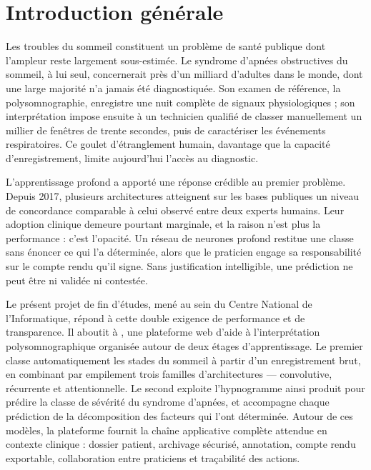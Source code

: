 \chapter*{Introduction générale}

Les troubles du sommeil constituent un problème de santé publique dont l'ampleur reste
largement sous-estimée. Le syndrome d'apnées obstructives du sommeil, à lui seul,
concernerait près d'un milliard d'adultes dans le monde, dont une large majorité n'a
jamais été diagnostiquée. Son examen de référence, la polysomnographie, enregistre une
nuit complète de signaux physiologiques ; son interprétation impose ensuite à un
technicien qualifié de classer manuellement un millier de fenêtres de trente secondes,
puis de caractériser les événements respiratoires. Ce goulet d'étranglement humain,
davantage que la capacité d'enregistrement, limite aujourd'hui l'accès au diagnostic.

L'apprentissage profond a apporté une réponse crédible au premier problème. Depuis
2017, plusieurs architectures atteignent sur les bases publiques un niveau de
concordance comparable à celui observé entre deux experts humains. Leur adoption
clinique demeure pourtant marginale, et la raison n'est plus la performance : c'est
l'opacité. Un réseau de neurones profond restitue une classe sans énoncer ce qui l'a
déterminée, alors que le praticien engage sa responsabilité sur le compte rendu qu'il
signe. Sans justification intelligible, une prédiction ne peut être ni validée ni
contestée.

Le présent projet de fin d'études, mené au sein du Centre National de l'Informatique,
répond à cette double exigence de performance et de transparence. Il aboutit à
\hypnoria{}, une plateforme web d'aide à l'interprétation polysomnographique organisée
autour de deux étages d'apprentissage. Le premier classe automatiquement les stades du
sommeil à partir d'un enregistrement brut, en combinant par empilement trois familles
d'architectures — convolutive, récurrente et attentionnelle. Le second exploite
l'hypnogramme ainsi produit pour prédire la classe de sévérité du syndrome d'apnées,
et accompagne chaque prédiction de la décomposition des facteurs qui l'ont déterminée.
Autour de ces modèles, la plateforme fournit la chaîne applicative complète attendue en
contexte clinique : dossier patient, archivage sécurisé, annotation, compte rendu
exportable, collaboration entre praticiens et traçabilité des actions.

